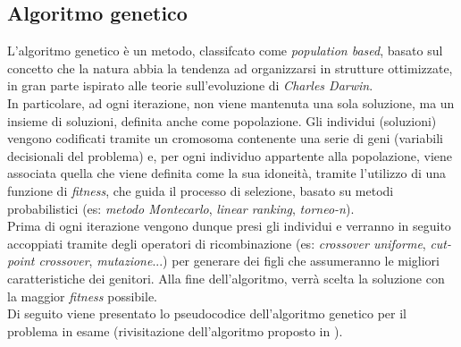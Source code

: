 \subsection{Algoritmo genetico}
\noindent L'algoritmo genetico \cite{siteS:dispense-de-giovanni} è un metodo, classifcato come \textit{population based}, basato sul concetto che la natura
abbia la tendenza ad organizzarsi in strutture ottimizzate, in gran parte ispirato
alle teorie sull'evoluzione di \textit{Charles Darwin}.\\
\noindent In particolare, ad ogni iterazione, non viene mantenuta una sola soluzione, ma un insieme di soluzioni, definita anche come popolazione.
Gli individui (soluzioni) vengono codificati tramite un cromosoma contenente una serie di geni (variabili decisionali del problema) e, per
ogni individuo appartente alla popolazione, viene associata quella che viene definita come la sua idoneità, tramite l'utilizzo di una
funzione di \textit{fitness}, che guida il processo di selezione, basato su metodi probabilistici (es: \textit{metodo Montecarlo}, \textit{linear ranking}, \textit{torneo-n}).\\
Prima di ogni iterazione vengono dunque presi gli individui e verranno in seguito accoppiati tramite degli operatori di ricombinazione
(es: \textit{crossover uniforme}, \textit{cut-point crossover}, \textit{mutazione}...)
per generare dei figli che assumeranno le migliori caratteristiche dei genitori. Alla fine dell'algoritmo, verrà scelta la soluzione con la maggior \textit{fitness} possibile.\\
Di seguito viene presentato lo pseudocodice dell'algoritmo genetico per il problema in esame (rivisitazione dell'algoritmo proposto in \cite{siteO:solid-github}).
\vspace*{\fill}
